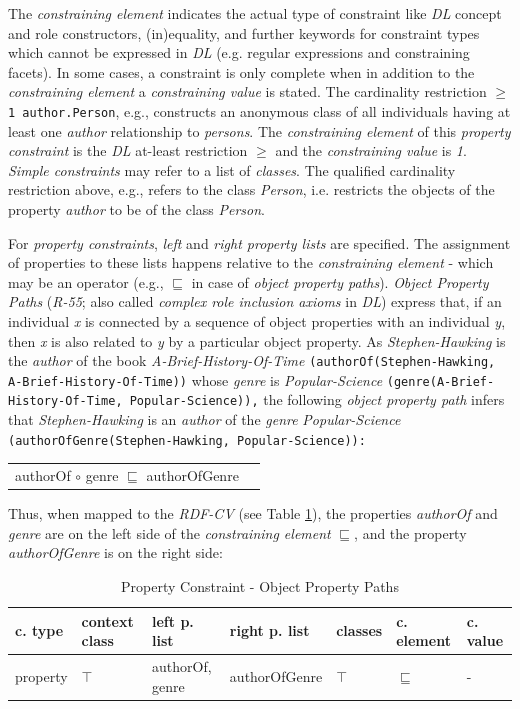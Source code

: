 \documentclass[a4paper,fontsize=11pt]{scrartcl}
\newcommand{\ms}[1]{\texttt{#1}}
\newenvironment{DL}{
  \vspace{0cm}
	\begin{center}
  \begin{tabular}{r l}

}{
  \end{tabular}
	\end{center}
}
\begin{document}
The \emph{constraining element} indicates the actual type of constraint like \emph{DL} concept and role constructors, (in)equality, and further keywords for constraint types which cannot be expressed in \emph{DL} (e.g. regular expressions and constraining facets).
In some cases, a constraint is only complete when in addition to the \emph{constraining element} a \emph{constraining value} is stated.
The cardinality restriction 
{\small\ms{$\geq$1 author.Person}}, e.g., 
constructs an anonymous class of all individuals having at least one \emph{author} relationship to \emph{persons}.
The \emph{constraining element} of this \emph{property constraint} is the \emph{DL} at-least restriction \emph{$\geq$} and the \emph{constraining value} is \emph{1}.
\emph{Simple constraints} may refer to a list of \emph{classes}.
The qualified cardinality restriction above, e.g., refers to the class \emph{Person}, 
i.e. restricts the objects of the property \emph{author} to be of the class \emph{Person}.

For \emph{property constraints}, \emph{left} and \emph{right property lists} are specified.
The assignment of properties to these lists happens relative to the \emph{constraining element} - which may be an operator (e.g., $\sqsubseteq$ in case of \emph{object property paths}).
\emph{Object Property Paths} (\emph{R-55}; also called \emph{complex role inclusion axioms} in \emph{DL})
express that, if an individual \emph{x} is connected by a sequence of object properties with an individual \emph{y}, 
then \emph{x} is also related to \emph{y} by a particular object property. 
As \emph{Stephen-Hawking} is the \emph{author} of the book \emph{A-Brief-History-Of-Time} {\small\ms{(authorOf(Stephen-Hawking, A-Brief-History-Of-Time))}} whose \emph{genre} is \emph{Popular-Science} {\small\ms{(genre(A-Brief-History-Of-Time, Popular-Science)),}}
the following \emph{object property path} infers that \emph{Stephen-Hawking} is an \emph{author} of the \emph{genre} \emph{Popular-Science} {\small\ms{(authorOfGenre(Stephen-Hawking, Popular-Science)):}}
\begin{DL}
authorOf $\circ$ genre $\sqsubseteq$ authorOfGenre 
\end{DL}
Thus, when mapped to the \emph{RDF-CV} (see Table \ref{tab:property-constraint-object-property-paths}), the properties \emph{authorOf} and \emph{genre} are on the left side of the \emph{constraining element} \emph{$\sqsubseteq$},
and the property \emph{authorOfGenre} is on the right side:

\begin{table}
  \scriptsize
  \sffamily
  \vspace{0cm}
	\caption{Property Constraint - Object Property Paths}
	\label{tab:property-constraint-object-property-paths}
	\centering
		\begin{tabular}{l|l|l|l|l|l|l}
      \textbf{c. type} & \textbf{context class} & \textbf{left p. list} & \textbf{right p. list} & \textbf{classes} & \textbf{c. element} & \textbf{c. value} \\
      \hline
      property & $\top$ & authorOf, genre & authorOfGenre & $\top$ & $\sqsubseteq$ & - \\
		\end{tabular}
\end{table}
\end{document}

